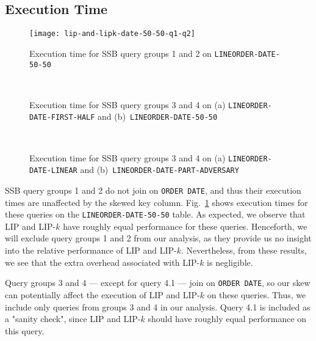 \subsection{Execution Time}
\label{sec:time}

\begin{figure}
    \centering
    \texttt{[image: lip-and-lipk-date-50-50-q1-q2]}
    \caption{Execution time for SSB query groups 1 and 2 on \texttt{LINEORDER-DATE-50-50}}
    \label{fig:times0}
\end{figure}

\begin{figure}
    \centering
    \\
    \caption{Execution time for SSB query groups 3 and 4 on (a) \texttt{LINEORDER-DATE-FIRST-HALF} and (b)~\texttt{LINEORDER-DATE-50-50}}
    \label{fig:times1}
\end{figure}


\begin{figure}
    \centering    
    \\
    \caption{Execution time for SSB query groups 3 and 4 on (a) \texttt{LINEORDER-DATE-LINEAR} and (b)~\texttt{LINEORDER-DATE-PART-ADVERSARY}}
    \label{fig:times2}
\end{figure}

SSB query groups 1 and 2 do not join on \texttt{ORDER DATE}, 
and thus their execution times are unaffected by the skewed key column. 
Fig.~\ref{fig:times0} shows execution times for these queries on the \texttt{LINEORDER-DATE-50-50} table.
As expected, we observe that LIP and LIP-$k$ have roughly equal performance for these queries.
Henceforth, we will exclude query groups 1 and 2 from our analysis, 
as they provide us no insight into the relative performance of LIP and LIP-$k$. 
Nevertheless, from these results, we see that the extra overhead associated with LIP-$k$ is negligible.

Query groups 3 and 4 --- except for query 4.1 --- join on \texttt{ORDER DATE}, 
so our skew can potentially affect the execution of LIP and LIP-$k$ on these queries.
Thus, we include only queries from groups 3 and 4 in our analysis. 
Query 4.1 is included as a "sanity check", since LIP and LIP-$k$ should have roughly equal performance on this query.

